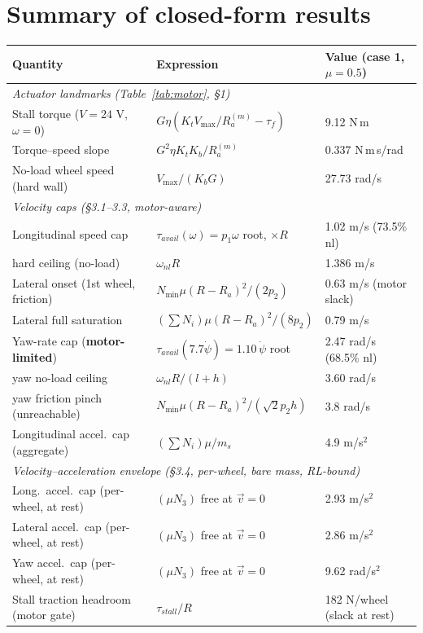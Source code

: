 \documentclass[11pt]{article}
\begin{document}
\section{Summary of closed-form results}
\begin{table}[h]\centering\small
\begin{tabular}{lll}
\toprule
Quantity & Expression & Value (case 1, $\mu=0.5$)\\
\midrule
\multicolumn{3}{l}{\emph{Actuator landmarks (Table~\ref{tab:motor}, \S1)}}\\
Stall torque ($V=24$ V, $\omega=0$) & $G\eta(K_tV_{\max}/R_a^{(m)}-\tau_f)$ & 9.12 N\,m\\
Torque--speed slope & $G^2\eta K_tK_b/R_a^{(m)}$ & 0.337 N\,m\,s/rad\\
No-load wheel speed (hard wall) & $V_{\max}/(K_bG)$ & 27.73 rad/s\\
\midrule
\multicolumn{3}{l}{\emph{Velocity caps (\S3.1--3.3, motor-aware)}}\\
Longitudinal speed cap & $\tau_{avail}(\omega)=p_1\omega$ root, $\times R$ & 1.02 m/s (73.5\% nl)\\
\quad hard ceiling (no-load) & $\omega_{nl}R$ & 1.386 m/s\\
Lateral onset (1st wheel, friction) & $N_{\min}\mu(R-R_a)^2/(2p_2)$ & 0.63 m/s (motor slack)\\
Lateral full saturation & $(\sum N_i)\mu(R-R_a)^2/(8p_2)$ & 0.79 m/s\\
Yaw-rate cap (\textbf{motor-limited}) & $\tau_{avail}(7.7\dot\psi)=1.10\,\dot\psi$ root & 2.47 rad/s (68.5\% nl)\\
\quad yaw no-load ceiling & $\omega_{nl}R/(l+h)$ & 3.60 rad/s\\
\quad yaw friction pinch (unreachable) & $N_{\min}\mu(R-R_a)^2/(\sqrt2 p_2h)$ & 3.8 rad/s\\
Longitudinal accel.\ cap (aggregate) & $(\sum N_i)\mu/m_s$ & 4.9 m/s$^2$\\
\midrule
\multicolumn{3}{l}{\emph{Velocity--acceleration envelope (\S3.4, per-wheel, bare mass, RL-bound)}}\\
Long.\ accel.\ cap (per-wheel, at rest) & $(\mu N_3)$ free at $\vec v=0$ & 2.93 m/s$^2$\\
Lateral accel.\ cap (per-wheel, at rest) & $(\mu N_3)$ free at $\vec v=0$ & 2.86 m/s$^2$\\
Yaw accel.\ cap (per-wheel, at rest) & $(\mu N_3)$ free at $\vec v=0$ & 9.62 rad/s$^2$\\
Stall traction headroom (motor gate) & $\tau_{stall}/R$ & 182 N/wheel (slack at rest)\\

\end{tabular}
\end{table}
\end{document}
